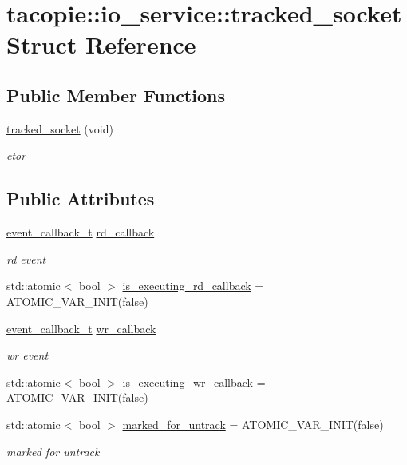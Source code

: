 \hypertarget{structtacopie_1_1io__service_1_1tracked__socket}{}\section{tacopie\+:\+:io\+\_\+service\+:\+:tracked\+\_\+socket Struct Reference}
\label{structtacopie_1_1io__service_1_1tracked__socket}
\subsection*{Public Member Functions}
\begin{DoxyCompactItemize}
\item 
\hyperlink{structtacopie_1_1io__service_1_1tracked__socket_aa2bb26f180847ad15e09f303a2adc9ee}{tracked\+\_\+socket} (void)
\begin{DoxyCompactList}\small\item\em ctor \end{DoxyCompactList}\end{DoxyCompactItemize}
\subsection*{Public Attributes}
\begin{DoxyCompactItemize}
\item 
\hyperlink{classtacopie_1_1io__service_abb66850c32d9c724f4418d77bd04bcfd}{event\+\_\+callback\+\_\+t} \hyperlink{structtacopie_1_1io__service_1_1tracked__socket_a4e44d4d8132f5272de80e83156d44fc6}{rd\+\_\+callback}
\begin{DoxyCompactList}\small\item\em rd event \end{DoxyCompactList}\item 
std\+::atomic$<$ bool $>$ \hyperlink{structtacopie_1_1io__service_1_1tracked__socket_ab7f5e0dc3e34376807ba696750bbf4f0}{is\+\_\+executing\+\_\+rd\+\_\+callback} = A\+T\+O\+M\+I\+C\+\_\+\+V\+A\+R\+\_\+\+I\+N\+IT(false)
\item 
\hyperlink{classtacopie_1_1io__service_abb66850c32d9c724f4418d77bd04bcfd}{event\+\_\+callback\+\_\+t} \hyperlink{structtacopie_1_1io__service_1_1tracked__socket_ae46fc6ee7102027316eceff64116ba9d}{wr\+\_\+callback}
\begin{DoxyCompactList}\small\item\em wr event \end{DoxyCompactList}\item 
std\+::atomic$<$ bool $>$ \hyperlink{structtacopie_1_1io__service_1_1tracked__socket_a017198d90760674aaa9591e7a9eb48c8}{is\+\_\+executing\+\_\+wr\+\_\+callback} = A\+T\+O\+M\+I\+C\+\_\+\+V\+A\+R\+\_\+\+I\+N\+IT(false)
\item 
std\+::atomic$<$ bool $>$ \hyperlink{structtacopie_1_1io__service_1_1tracked__socket_ac72d2fbf2c0e314c7ea02afd2c081dcd}{marked\+\_\+for\+\_\+untrack} = A\+T\+O\+M\+I\+C\+\_\+\+V\+A\+R\+\_\+\+I\+N\+IT(false)
\begin{DoxyCompactList}\small\item\em marked for untrack \end{DoxyCompactList}\end{DoxyCompactItemize}


